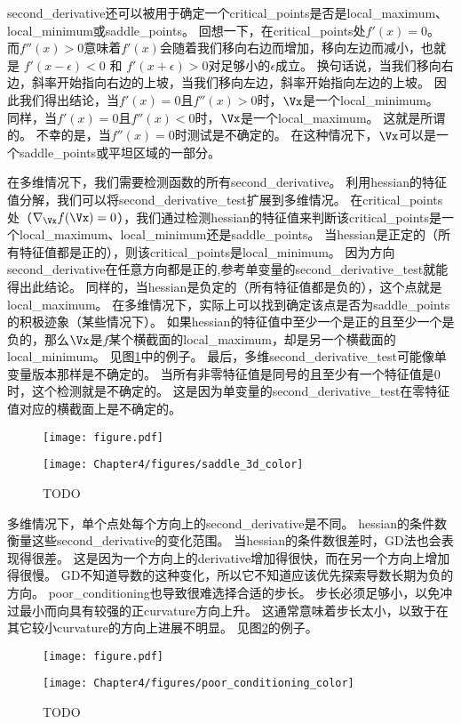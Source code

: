 \gls{second_derivative}还可以被用于确定一个\gls{critical_points}是否是\gls{local_maximum}、\gls{local_minimum}或\gls{saddle_points}。
回想一下，在\gls{critical_points}处$f'(x) = 0$。
而$f''(x) > 0$意味着$f'(x)$会随着我们移向右边而增加，移向左边而减小，也就是 $f'(x - \epsilon) < 0$ 和 $f'(x+\epsilon)>0$对足够小的$\epsilon$成立。 换句话说，当我们移向右边，斜率开始指向右边的上坡，当我们移向左边，斜率开始指向左边的上坡。
因此我们得出结论，当$f'(x) = 0$且$f''(x) > 0$时，$\Vx$是一个\gls{local_minimum}。
同样，当$f'(x) = 0$且$f''(x) < 0$时，$\Vx$是一个\gls{local_maximum}。
这就是所谓的。
不幸的是，当$f''(x) = 0$时测试是不确定的。
在这种情况下，$\Vx$可以是一个\gls{saddle_points}或平坦区域的一部分。


在多维情况下，我们需要检测函数的所有\gls{second_derivative}。
利用\gls{hessian}的特征值分解，我们可以将\gls{second_derivative_test}扩展到多维情况。
在\gls{critical_points}处（$\nabla_{\Vx} f(\Vx) = 0$），我们通过检测\gls{hessian}的特征值来判断该\gls{critical_points}是一个\gls{local_maximum}、\gls{local_minimum}还是\gls{saddle_points}。
当\gls{hessian}是正定的（所有特征值都是正的），则该\gls{critical_points}是\gls{local_minimum}。
因为方向\gls{second_derivative}在任意方向都是正的,参考单变量的\gls{second_derivative_test}就能得出此结论。
同样的，当\gls{hessian}是负定的（所有特征值都是负的），这个点就是\gls{local_maximum}。
在多维情况下，实际上可以找到确定该点是否为\gls{saddle_points}的积极迹象（某些情况下）。
如果\gls{hessian}的特征值中至少一个是正的且至少一个是负的，那么$\Vx$是$f$某个横截面的\gls{local_maximum}，却是另一个横截面的\gls{local_minimum}。
见图\ref{fig:chap4_saddle_3d_color}中的例子。
最后，多维\gls{second_derivative_test}可能像单变量版本那样是不确定的。
当所有非零特征值是同号的且至少有一个特征值是$0$时，这个检测就是不确定的。
这是因为单变量的\gls{second_derivative_test}在零特征值对应的横截面上是不确定的。
\begin{figure}[!htb]
\ifOpenSource
\centerline{\texttt{[image: figure.pdf]}}
\else
\centerline{\texttt{[image: Chapter4/figures/saddle\_3d\_color]}}
\fi
\caption{TODO}
\label{fig:chap4_saddle_3d_color}
\end{figure}

多维情况下，单个点处每个方向上的\gls{second_derivative}是不同。
\gls{hessian}的条件数衡量这些\gls{second_derivative}的变化范围。
当\gls{hessian}的条件数很差时，\gls{GD}法也会表现得很差。
这是因为一个方向上的\gls{derivative}增加得很快，而在另一个方向上增加得很慢。
\gls{GD}不知道导数的这种变化，所以它不知道应该优先探索导数长期为负的方向。
\gls{poor_conditioning}也导致很难选择合适的步长。
步长必须足够小，以免冲过最小而向具有较强的正\gls{curvature}方向上升。
这通常意味着步长太小，以致于在其它较小\gls{curvature}的方向上进展不明显。
见图\ref{fig:chap4_poor_conditioning_color}的例子。
\begin{figure}[!htb]
\ifOpenSource
\centerline{\texttt{[image: figure.pdf]}}
\else
\centerline{\texttt{[image: Chapter4/figures/poor\_conditioning\_color]}}
\fi
\caption{TODO}
\label{fig:chap4_poor_conditioning_color}
\end{figure}

